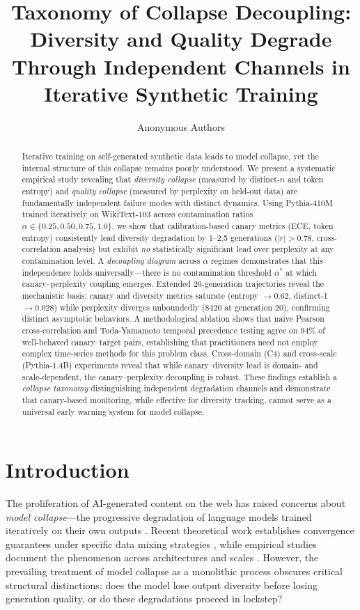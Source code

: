 \documentclass[letterpaper,11pt]{article}
\title{Taxonomy of Collapse Decoupling: Diversity and Quality Degrade\\Through Independent Channels in Iterative Synthetic Training}
\author{
Anonymous Authors
}
\begin{document}
\maketitle

\begin{abstract}
Iterative training on self-generated synthetic data leads to model collapse, yet the internal structure of this collapse remains poorly understood.
We present a systematic empirical study revealing that \emph{diversity collapse} (measured by distinct-$n$ and token entropy) and \emph{quality collapse} (measured by perplexity on held-out data) are fundamentally independent failure modes with distinct dynamics.
Using Pythia-410M trained iteratively on WikiText-103 across contamination ratios $\alpha \in \{0.25, 0.50, 0.75, 1.0\}$, we show that calibration-based canary metrics (ECE, token entropy) consistently lead diversity degradation by 1--2.5 generations ($|r| > 0.78$, cross-correlation analysis) but exhibit \emph{no} statistically significant lead over perplexity at any contamination level.
A \emph{decoupling diagram} across $\alpha$ regimes demonstrates that this independence holds universally---there is no contamination threshold $\alpha^*$ at which canary--perplexity coupling emerges.
Extended 20-generation trajectories reveal the mechanistic basis: canary and diversity metrics saturate (entropy $\to 0.62$, distinct-1 $\to 0.028$) while perplexity diverges unboundedly ($8420$ at generation 20), confirming distinct asymptotic behaviors.
A methodological ablation shows that naive Pearson cross-correlation and Toda-Yamamoto temporal precedence testing agree on 94\% of well-behaved canary--target pairs, establishing that practitioners need not employ complex time-series methods for this problem class.
Cross-domain (C4) and cross-scale (Pythia-1.4B) experiments reveal that while canary--diversity lead is domain- and scale-dependent, the canary--perplexity decoupling is robust.
These findings establish a \emph{collapse taxonomy} distinguishing independent degradation channels and demonstrate that canary-based monitoring, while effective for diversity tracking, cannot serve as a universal early warning system for model collapse.
\end{abstract}

\section{Introduction}

The proliferation of AI-generated content on the web has raised concerns about \emph{model collapse}---the progressive degradation of language models trained iteratively on their own outputs \cite{shumailov2024ai}.
Recent theoretical work establishes convergence guarantees under specific data mixing strategies \cite{fu2024towards}, while empirical studies document the phenomenon across architectures and scales \cite{dohmatob2024model}.
However, the prevailing treatment of model collapse as a monolithic process obscures critical structural distinctions: does the model lose output diversity before losing generation quality, or do these degradations proceed in lockstep?
\end{document}
